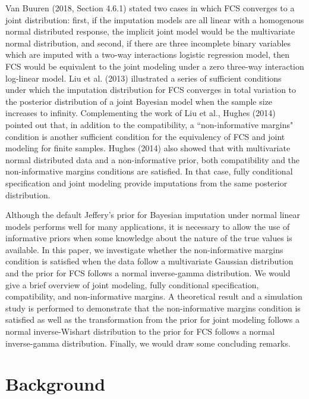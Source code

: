 \documentclass[12pt, fullpage, a4paper]{article}
\begin{document}
Van Buuren (2018, Section 4.6.1) stated two cases in which FCS converges to a joint distribution: first, if the imputation models are all linear with a homogenous normal distributed response, the implicit joint model would be the multivariate normal distribution, and second, if there are three incomplete binary variables which are imputed with a two-way interactions logistic regression model, then FCS would be equivalent to the joint modeling under a zero three-way interaction log-linear model. Liu et al. (2013)\nocite{liu2014stationary} illustrated a series of sufficient conditions under which the imputation distribution for FCS converges in total variation to the posterior distribution of a joint Bayesian model when the sample size increases to infinity. Complementing the work of Liu et al., Hughes (2014) pointed out that, in addition to the compatibility, a ``non-informative margins" condition is another sufficient condition for the equivalency of FCS and joint modeling for finite samples. Hughes (2014) also showed that with multivariate normal distributed data and a non-informative prior, both compatibility and the non-informative margins conditions are satisfied. In that case, fully conditional specification and joint modeling provide imputations from the same posterior distribution. 

Although the default Jeffery's prior for Bayesian imputation under normal linear models performs well for many applications, it is necessary to allow the use of informative priors when some knowledge about the nature of the true values is available. In this paper, we investigate whether the non-informative margins condition is satisfied when the data follow a multivariate Gaussian distribution and the prior for FCS follows a normal inverse-gamma distribution. We would give a brief overview of joint modeling, fully conditional specification, compatibility, and non-informative margins. A theoretical result and a simulation study is performed to demonstrate that the non-informative margins condition is satisfied as well as the transformation from the prior for joint modeling follows a normal inverse-Wishart distribution to the prior for FCS follows a normal inverse-gamma distribution. Finally, we would draw some concluding remarks. 

\section{Background}
\end{document}
